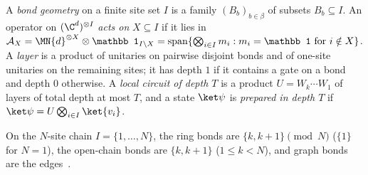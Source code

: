 \begin{definition}
    \label{def:qc_local_circuit}
    \leanok
    A \emph{bond geometry} on a finite site set $I$ is a family $(B_b)_{b\in\beta}$ of subsets $B_b\subseteq I$. An operator on $(\C^d)^{\otimes I}$ \emph{acts on} $X\subseteq I$ if it lies in $\mathcal A_X=\MN{d}^{\otimes X}\otimes\mathbb 1_{I\setminus X}=\operatorname{span}\{\bigotimes_{i\in I}m_i:m_i=\mathbb 1\text{ for }i\notin X\}$. A \emph{layer} is a product of unitaries on pairwise disjoint bonds and of one-site unitaries on the remaining sites; it has depth $1$ if it contains a gate on a bond and depth $0$ otherwise. A \emph{local circuit of depth $T$} is a product $U=W_k\cdots W_1$ of layers of total depth at most $T$, and a state $\ket\psi$ is \emph{prepared in depth $T$} if $\ket\psi=U\bigotimes_{i\in I}\ket{v_i}$.

    On the $N$-site chain $I=\{1,\dots,N\}$, the ring bonds are $\{k,k+1\}\pmod N$ ($\{1\}$ for $N=1$), the open-chain bonds are $\{k,k+1\}$ ($1\le k<N$), and graph bonds are the edges~\cite{Piroli2021LOCC}.
\end{definition}

